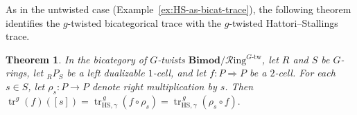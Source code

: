 \documentclass[11pt,oneside]{amsart}
\numberwithin{equation}{section}
\numberwithin{figure}{section}
\theoremstyle{plain}
\newtheorem{thm}{Theorem}[section]
\theoremstyle{definition}
\theoremstyle{remark}
\begin{document}
As in the untwisted case
(Example~\ref{ex:HS-as-bicat-trace}), the following theorem identifies
the \(g\)-twisted bicategorical trace with the
\(g\)-twisted Hattori--Stallings trace.

\begin{thm}\label{thm:twHS-recovery-general}
In the bicategory of $G$-twists $\mathbf{Bimod}/\mathcal{R}\mathrm{ing}^{G\text{-tw}}$,
let $R$ and $S$ be $G$-rings, let ${}_R P_S$ be a left dualizable $1$-cell,
and let $f\colon P \Rightarrow P$ be a $2$-cell. For each $s\in S$, let
\(
\rho_s\colon P\to P
\)
denote right multiplication by $s$. Then
\(\operatorname{tr}^g(f)([s])
=
\operatorname{tr}_{\mathrm{HS},\gamma}^{\,g}(f\circ\rho_s)
=
\operatorname{tr}_{\mathrm{HS},\gamma}^{\,g}(\rho_s\circ f).\)
\end{thm}

 
\end{document}

